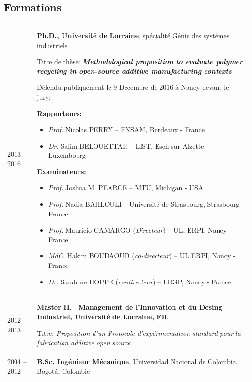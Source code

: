 \documentclass[
  11pt,
]{article}
\begin{document}
\hypertarget{formations}{%
\subsection{Formations}\label{formations}}

\begin{tabu} to \linewidth {X[0.3,l] X[2,l]}

2013 -- 2016 & \textbf{Ph.D., Université de Lorraine}, spécialité Génie des systèmes industriels \par
    Titre de thèse: \textbf{\emph{Methodological proposition to evaluate polymer recycling in open-source additive manufacturing contexts}} \par\vspace{5pt}
    
Défendu publiquement le 9 Décembre de 2016 à Nancy devant le jury:\par\vspace{5pt}

    \textbf{Rapporteurs:}
    \begin{itemize}
    
        \item \textit{Prof.} Nicolas PERRY --  ENSAM, Bordeaux - France
        \item \textit{Dr.} Salim BELOUETTAR -- LIST, Esch-sur-Alzette - Luxembourg
    \end{itemize}

\vspace{5pt}
    \textbf{Examinateurs:}
    \begin{itemize}
    
        \item \textit{Prof.} Joshua M. PEARCE -- MTU, Michigan - USA
        \item \textit{Prof.} Nadia BAHLOULI -- Université de Strasbourg, Strasbourg - France
        \item \textit{Prof.} Mauricio CAMARGO (\textit{Directeur}) -- UL, ERPI, Nancy - France
        
        \item \textit{MdC.} Hakim BOUDAOUD (\textit{co-directeur}) -- UL ERPI, Nancy - France
        
        \item \textit{Dr.} Sandrine HOPPE (\textit{co-directeur})  --  LRGP, Nancy - France
    \end{itemize}
        \\ [5pt]

2012 -- 2013 &
    \textbf{Master II.~ Management de l'Innovation et du Desing Industriel, Université de Lorraine, FR} \par Titre: \emph{Proposition d'un Protocole d'expérimentation standard pour la fabrication additive open source} \\[5pt]

2004 -- 2012 &
    \textbf{B.Sc. Ingénieur Mécanique}, Universidad Nacional de Colombia, Bogotá, Colombie \\
    
\end{tabu}
\end{document}
